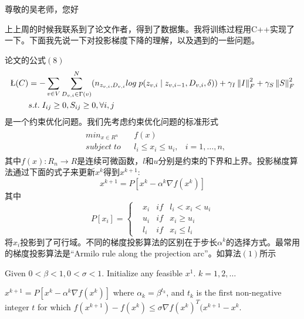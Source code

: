 \documentclass[UTF8]{ctexart}
\begin{document}
\par 尊敬的吴老师，您好
\newline
\par
上上周的时候我联系到了论文作者，得到了数据集。我将训练过程用C++实现了一下。下面我先说一下对投影梯度下降的理解，以及遇到的一些问题。
\par 
论文的公式$(8)$
\begin{equation*}
\begin{matrix}
\begin{aligned} 
 \L (C) &= -\sum _{v \in V}\sum _{D_{v,i}\in \Gamma (v)}^{N}(n_{z_{v,i},D_{v,i}}log \; p(z_{v,i}\mid z_{v,i-1}, D_{v,i},\delta)) + \gamma _{I}\left \| I \right \|_{F}^{2}+\gamma _{S}\left \| S \right \|_{F}^{2} \\ 
 &s.t.\; I_{ij}\geq 0,S_{ij}\geq 0,\forall i,j 
\end{aligned}
\end{matrix}
\end{equation*}
是一个约束优化问题。我们先考虑约束优化问题的标准形式
\begin{equation*}
\begin{matrix}
\begin{aligned} 
& min_{x \in R^{n}} && f(x) &\\ 
& subject\; to && l_{i}\leq x_{i}\leq u_{i},& i=1,\dots,n, 
\end{aligned}
\end{matrix}
\end{equation*}
其中$f(x): R_{n}\rightarrow R$是连续可微函数，$l$和$u$分别是约束的下界和上界。投影梯度算法通过下面的式子来更新$x^{k}$得到$x^{k+1}$:
\begin{equation*}
x^{k+1}=P\left [ x^{k}-\alpha^{k} \nabla f(x^{k}) \right ]
\end{equation*}
其中
\begin{equation*}
P\left [ x_{i} \right ]=\left\{\begin{matrix}
 & x_{i} & if &l_{i}<x_{i}<u_{i} \\
 & u_{i} & if &x_{i}\geq u_{i} \\
 & l_{i} & if &x_{i}\leq l_{i}
\end{matrix}\right.
\end{equation*}
将$x_{i}$投影到了可行域。不同的梯度投影算法的区别在于步长$\alpha^{k}$的选择方式。最常用的梯度投影算法是“Armilo rule along the projection arc”。如算法$(1)$所示
\begin{codebox}[\indent ]
\zi  Given $0<\beta <1,0<\sigma<1$. Initialize any feasible $x^{1}$.
\zi \Indentmore \Indentmore {} $k=1,2,\dots$

\zi	\Indentmore 	$x^{k+1}=P\left [ x^{k}-\alpha^{k} \nabla f(x^{k}) \right ]$
	\End \End \End
\zi \Indentmore \Indentmore where $\alpha_{k}=\beta^{t_{k}}$, and $t_{k}$ is the first non-negative integer $t$ for which
\zi \Indentmore $f(x^{k+1})-f(x^{k}) \leq \sigma \nabla f(x^{k})^{T}(x^{k+1}-x^{k}$.
\end{codebox}
\end{document}
